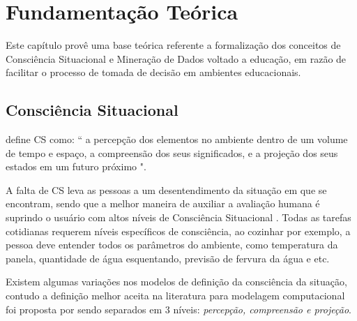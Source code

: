 \documentclass[12pt]{article}
\begin{document}
\section{Fundamentação Teórica} \label{sec:firstpage}
	
Este capítulo provê uma base teórica referente a formalização dos conceitos de Consciência Situacional e Mineração de Dados voltado a educação, em razão de facilitar o processo de tomada de decisão em ambientes educacionais.  

\subsection{Consciência Situacional}

\cite [p. 97]{Endsley1988} define CS como: `` a percepção dos elementos no ambiente dentro de um volume de tempo e espaço, a compreensão dos seus significados, e a projeção dos seus estados em um futuro próximo ".

A falta de CS leva as pessoas a um desentendimento da situação em que se encontram, sendo que a melhor maneira de auxiliar a avaliação humana é suprindo o usuário com altos níveis de Consciência Situacional \cite{Endsley2012}. Todas as tarefas cotidianas requerem níveis específicos de consciência, ao cozinhar por exemplo, a pessoa deve entender todos os parâmetros do ambiente, como temperatura da panela, quantidade de água esquentando, previsão de fervura da água e etc.

Existem algumas variações nos modelos de definição da consciência da situação, contudo a definição melhor aceita na literatura para modelagem computacional foi proposta por \cite{Endsley1995} sendo separados em 3 níveis: \emph{percepção, compreensão e projeção}.
\end{document}
